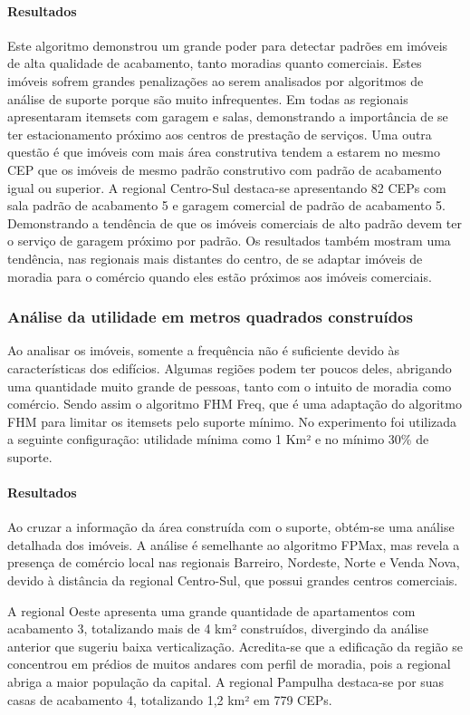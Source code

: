 \documentclass[12pt]{article}
\begin{document}
\paragraph{Resultados}
Este algoritmo demonstrou um grande poder para detectar padrões em imóveis de alta qualidade de acabamento, tanto moradias quanto comerciais. Estes imóveis sofrem grandes penalizações ao serem analisados por algoritmos de análise de suporte porque são muito infrequentes. Em todas as regionais apresentaram itemsets com garagem e salas, demonstrando a importância de se ter estacionamento próximo aos centros de prestação de serviços. Uma outra questão é que imóveis com mais área construtiva tendem a estarem no mesmo CEP que os imóveis de mesmo padrão construtivo com padrão de acabamento igual ou superior. A regional Centro-Sul destaca-se apresentando 82 CEPs com sala padrão de acabamento 5 e garagem comercial de padrão de acabamento 5. Demonstrando a tendência de que os imóveis comerciais de alto padrão devem ter o serviço de garagem próximo por padrão. Os resultados também mostram uma tendência, nas regionais mais distantes do centro, de se adaptar imóveis de moradia para o comércio quando eles estão próximos aos imóveis comerciais.

\subsubsection{Análise da utilidade em metros quadrados construídos}
Ao analisar os imóveis, somente a frequência não é suficiente devido às características dos edifícios. Algumas regiões podem ter poucos deles, abrigando uma quantidade muito grande de pessoas, tanto com o intuito de moradia como comércio. Sendo assim o algoritmo FHM Freq, que é uma adaptação do algoritmo FHM \cite{fournier2014fhm} para limitar os itemsets pelo suporte mínimo. No experimento foi utilizada a seguinte configuração: utilidade mínima como 1 Km² e no mínimo 30\% de suporte.
\paragraph{Resultados}
Ao cruzar a informação da área construída com o suporte, obtém-se uma análise detalhada dos imóveis. A análise é semelhante ao algoritmo FPMax, mas revela a presença de comércio local nas regionais Barreiro, Nordeste, Norte e Venda Nova, devido à distância da regional Centro-Sul, que possui grandes centros comerciais.

A regional Oeste apresenta uma grande quantidade de apartamentos com acabamento 3, totalizando mais de 4 km² construídos, divergindo da análise anterior que sugeriu baixa verticalização. Acredita-se que a edificação da região se concentrou em prédios de muitos andares com perfil de moradia, pois a regional abriga a maior população da capital. A regional Pampulha destaca-se por suas casas de acabamento 4, totalizando 1,2 km² em 779 CEPs.
\end{document}
